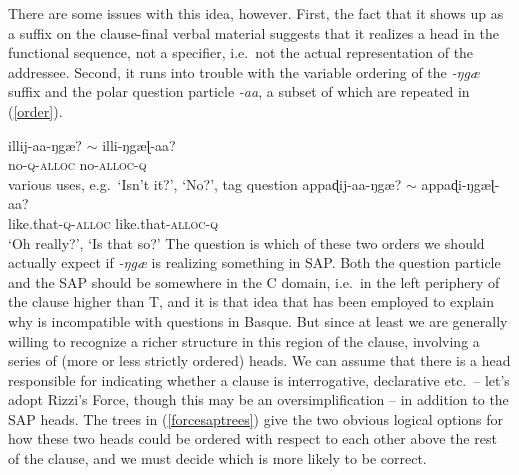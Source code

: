 \documentclass[output=paper, modfonts, nonflat]{langsci/langscibook}
\begin{document}
There are some issues with this idea, however.  First, the fact that
it shows up as a suffix on the clause-final verbal material suggests
that it realizes a head in the functional sequence, not a specifier,
i.e.\ not the actual representation of the addressee. Second, it runs
into trouble with the variable ordering of the \textit{-ŋgæ} suffix
and the polar question particle \textit{-aa}, a subset of which are
repeated in (\ref{order}).

\ea\label{order}
 \ea\label{illiya2}\gll illij-aa-ŋgæ? $\sim$ illi-ŋgæɭ-aa?\\
 no-\textsc{q}-\textsc{alloc} {} no-\textsc{alloc}-\textsc{q}\\
 \glt various uses, e.g.\ `Isn't it?', `No?', tag question
 \ex\label{apdiya2}\gll appaɖij-aa-ŋgæ? $\sim$ appaɖi-ŋgæɭ-aa?\\
 like.that-\textsc{q}-\textsc{alloc} {} like.that-\textsc{alloc}-\textsc{q}\\
 \glt `Oh really?', `Is that so?' 
  \z
\z
%
The question is which of these two orders we should actually expect
if \textit{-ŋgæ} is realizing something in SAP.  Both the question
particle and the SAP should be somewhere in the C domain, i.e.\ in the
left periphery of the clause higher than T, and it is that idea that
has been employed to explain why \allagr{} is incompatible with
questions in Basque.  But since at least \citet{rizzi:1997} we are
generally willing to recognize a richer structure in this region of
the clause, involving a series of (more or less strictly ordered)
heads. We can assume that there is a head responsible for indicating
whether a clause is interrogative, declarative etc.\ -- let's adopt
Rizzi's Force, though this may be an oversimplification -- in
addition to the SAP heads. The trees in (\ref{forcesaptrees}) give the
two obvious logical options for how these two heads could be ordered
with respect to each other above the rest of the clause, and we must
decide which is more likely to be correct.%
\end{document}
